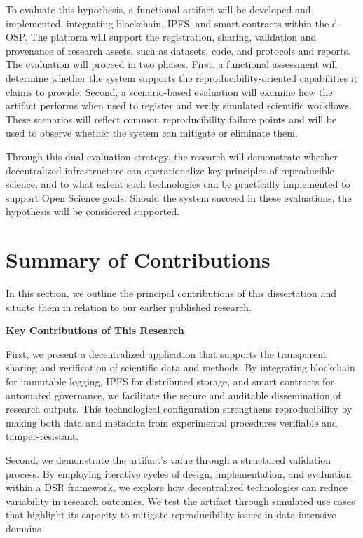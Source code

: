 \documentclass[final]{rc-book-2.14}
\begin{document}
To evaluate this hypothesis, a functional artifact will be developed and implemented, integrating blockchain, IPFS, and smart contracts within the d-OSP. The platform will support the registration, sharing, validation and provenance of research assets, such as datasets, code, and protocols and reports. The evaluation will proceed in two phases. First, a functional assessment will determine whether the system supports the reproducibility-oriented capabilities it claims to provide. Second, a scenario-based evaluation will examine how the artifact performs when used to register and verify simulated scientific workflows. These scenarios will reflect common reproducibility failure points and will be used to observe whether the system can mitigate or eliminate them.

Through this dual evaluation strategy, the research will demonstrate whether decentralized infrastructure can operationalize key principles of reproducible science, and to what extent such technologies can be practically implemented to support Open Science goals. Should the system succeed in these evaluations, the hypothesis will be considered supported. 

\section{Summary of Contributions}
\label{chp:intro:sec:contributions}

In this section, we outline the principal contributions of this dissertation and situate them in relation to our earlier published research. 

\textbf{Key Contributions of This Research}

First, we present a decentralized application that supports the transparent sharing and verification of scientific data and methods. By integrating blockchain for immutable logging, IPFS for distributed storage, and smart contracts for automated governance, we facilitate the secure and auditable dissemination of research outputs. This technological configuration strengthens reproducibility by making both data and metadata from experimental procedures verifiable and tamper-resistant.

Second, we demonstrate the artifact's value through a structured validation process. By employing iterative cycles of design, implementation, and evaluation within a DSR framework, we explore how decentralized technologies can reduce variability in research outcomes. We test the artifact through simulated use cases that highlight its capacity to mitigate reproducibility issues in data-intensive domains.
\end{document}
